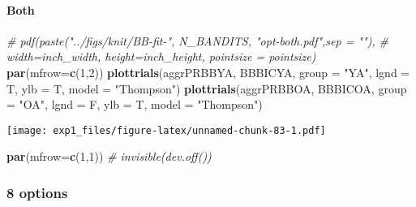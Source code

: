 \documentclass[11pt,,]{article}
\newenvironment{Shaded}{\begin{snugshade}}{\end{snugshade}}
\newcommand{\KeywordTok}[1]{\textcolor[rgb]{0.13,0.29,0.53}{\textbf{{#1}}}}
\newcommand{\DataTypeTok}[1]{\textcolor[rgb]{0.13,0.29,0.53}{{#1}}}
\newcommand{\DecValTok}[1]{\textcolor[rgb]{0.00,0.00,0.81}{{#1}}}
\newcommand{\StringTok}[1]{\textcolor[rgb]{0.31,0.60,0.02}{{#1}}}
\newcommand{\CommentTok}[1]{\textcolor[rgb]{0.56,0.35,0.01}{\textit{{#1}}}}
\newcommand{\NormalTok}[1]{{#1}}
\let\oldparagraph\paragraph
\renewcommand{\paragraph}[1]{\oldparagraph{#1}\mbox{}}
\begin{document}
\newpage

\paragraph{Both}\label{both}

\begin{Shaded}
\end{Shaded}

\begin{Shaded}
\begin{Highlighting}[]
\CommentTok{# pdf(paste("../figs/knit/BB-fit-",  N_BANDITS, "opt-both.pdf",sep = ""), }
\CommentTok{# width=inch_width, height=inch_height, pointsize = pointsize)}
\KeywordTok{par}\NormalTok{(}\DataTypeTok{mfrow=}\KeywordTok{c}\NormalTok{(}\DecValTok{1}\NormalTok{,}\DecValTok{2}\NormalTok{))}
\KeywordTok{plottrials}\NormalTok{(aggrPRBBYA, BBBICYA, }\DataTypeTok{group =} \StringTok{"YA"}\NormalTok{, }\DataTypeTok{lgnd =} \NormalTok{T, }\DataTypeTok{ylb =} \NormalTok{T, }\DataTypeTok{model =} \StringTok{"Thompson"}\NormalTok{)}
\KeywordTok{plottrials}\NormalTok{(aggrPRBBOA, BBBICOA, }\DataTypeTok{group =} \StringTok{"OA"}\NormalTok{, }\DataTypeTok{lgnd =} \NormalTok{F, }\DataTypeTok{ylb =} \NormalTok{T, }\DataTypeTok{model =} \StringTok{"Thompson"}\NormalTok{)}
\end{Highlighting}
\end{Shaded}

\texttt{[image: exp1\_files/figure-latex/unnamed-chunk-83-1.pdf]}

\begin{Shaded}
\begin{Highlighting}[]
\KeywordTok{par}\NormalTok{(}\DataTypeTok{mfrow=}\KeywordTok{c}\NormalTok{(}\DecValTok{1}\NormalTok{,}\DecValTok{1}\NormalTok{))}
\CommentTok{# invisible(dev.off())}
\end{Highlighting}
\end{Shaded}

\newpage 

\subsubsection{8 options}\label{options-1}
\end{document}
